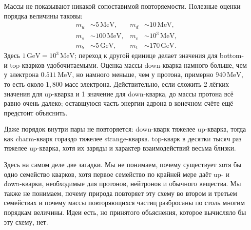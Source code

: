 Массы не показывают никакой сопоставимой повторяемости. Полезные оценки порядка величины таковы:
\begin{align}
m_u &\sim 5\,\mathrm{MeV},
&
m_d &\sim 10\,\mathrm{MeV},
\\
m_s &\sim 100\,\mathrm{MeV},
&
m_c &\sim 10^3\,\mathrm{MeV},
\\
m_b &\sim 5\,\mathrm{GeV},
&
m_t &\sim 170\,\mathrm{GeV}.
\end{align}
Здесь \(1\,\mathrm{GeV}=10^3\,\mathrm{MeV}\); переход к другой единице делает значения для bottom- и top-кварков удобочитаемыми. Оценка массы down-кварка намного больше, чем у электрона \(0.511\,\mathrm{MeV}\), но намного меньше, чем у протона, примерно \(940\,\mathrm{MeV}\), то есть около \(1{,}800\) масс электрона. Действительно, если сложить 2 лёгких значения для up-кварка и 1 значение для down-кварка, до массы протона всё равно очень далеко; оставшуюся часть энергии адрона в конечном счёте ещё предстоит объяснить.


Даже порядок внутри пары не повторяется: down-кварк тяжелее up-кварка, тогда как charm-кварк гораздо тяжелее strange-кварка. top-кварк в десятки тысяч раз тяжелее up-кварка, хотя их заряды и характер взаимодействий весьма близки.

Здесь на самом деле две загадки. Мы не понимаем, почему существует хотя бы одно семейство кварков, хотя первое семейство по крайней мере даёт up- и down-кварки, необходимые для протонов, нейтронов и обычного вещества. Мы также не понимаем, почему природа повторяет эту схему во втором и третьем семействах и почему массы повторяющихся частиц разбросаны по столь многим порядкам величины. Идеи есть, но принятого объяснения, которое вычисляло бы эту схему, нет.

\begin{classroomqa}
\end{classroomqa}

